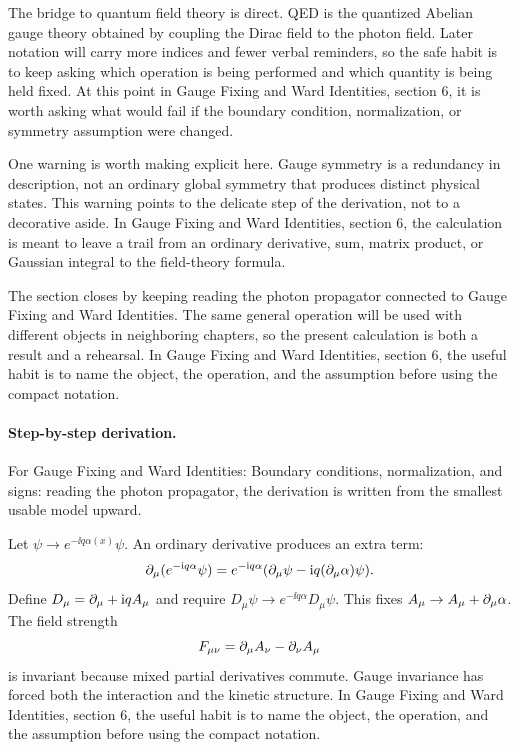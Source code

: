 The bridge to quantum field theory is direct.  QED is the quantized Abelian gauge theory obtained by coupling the Dirac field to the photon field.  Later notation will carry more indices and fewer verbal reminders, so the safe habit is to keep asking which operation is being performed and which quantity is being held fixed.  At this point in Gauge Fixing and Ward Identities, section 6, it is worth asking what would fail if the boundary condition, normalization, or symmetry assumption were changed.

One warning is worth making explicit here.  Gauge symmetry is a redundancy in description, not an ordinary global symmetry that produces distinct physical states.  This warning points to the delicate step of the derivation, not to a decorative aside.  In Gauge Fixing and Ward Identities, section 6, the calculation is meant to leave a trail from an ordinary derivative, sum, matrix product, or Gaussian integral to the field-theory formula.

The section closes by keeping reading the photon propagator connected to Gauge Fixing and Ward Identities.  The same general operation will be used with different objects in neighboring chapters, so the present calculation is both a result and a rehearsal.  In Gauge Fixing and Ward Identities, section 6, the useful habit is to name the object, the operation, and the assumption before using the compact notation.



\paragraph{Step-by-step derivation.}

For Gauge Fixing and Ward Identities: Boundary conditions, normalization, and signs: reading the photon propagator, the derivation is written from the smallest usable model upward.

Let \(\psi\to e^{-\ii q\alpha(x)}\psi\).  An ordinary derivative produces an extra term:
\[
  \partial_\mu(e^{-\mathrm i q\alpha}\psi)
  =
  e^{-\mathrm i q\alpha}(\partial_\mu\psi-\mathrm i q(\partial_\mu\alpha)\psi).
\]
Define \(D_\mu=\partial_\mu+\mathrm i qA_\mu\) and require \(D_\mu\psi\to e^{-\ii q\alpha}D_\mu\psi\).  This fixes \(A_\mu\to A_\mu+\partial_\mu\alpha\).  The field strength
\[
  F_{\mu\nu}=\partial_\mu A_\nu-\partial_\nu A_\mu
\]
is invariant because mixed partial derivatives commute.  Gauge invariance has forced both the interaction and the kinetic structure.  In Gauge Fixing and Ward Identities, section 6, the useful habit is to name the object, the operation, and the assumption before using the compact notation.


